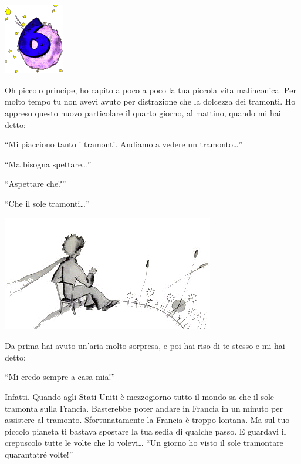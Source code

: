 \documentclass[11pt]{scrbook}
\begin{document}
\chapter{}
\begin{center}
\includegraphics{img/chapter6}
\end{center}

Oh piccolo principe, ho capito a poco a poco la tua piccola vita malinconica. Per molto tempo tu non avevi avuto per distrazione che la dolcezza dei tramonti. Ho appreso questo nuovo particolare il quarto giorno, al mattino, quando mi hai detto:

``Mi piacciono tanto i tramonti. Andiamo a vedere un tramonto\ldots{}''

``Ma bisogna spettare\ldots{}''

``Aspettare che?''

``Che il sole tramonti\ldots{}''

\begin{center}
\includegraphics{img/6a}
\end{center}

Da prima hai avuto un'aria molto sorpresa, e poi hai riso di te stesso e mi hai detto:

``Mi credo sempre a casa mia!''

Infatti. Quando agli Stati Uniti è mezzogiorno tutto il mondo sa che il sole tramonta sulla Francia. Basterebbe poter andare in Francia in un minuto per assistere al tramonto. Sfortunatamente la Francia è troppo lontana. Ma sul tuo piccolo pianeta ti bastava spostare la tua sedia di qualche passo. E guardavi il crepuscolo tutte le volte che lo volevi\ldots{} ``Un giorno ho visto il sole tramontare quarantatré volte!''
\end{document}
